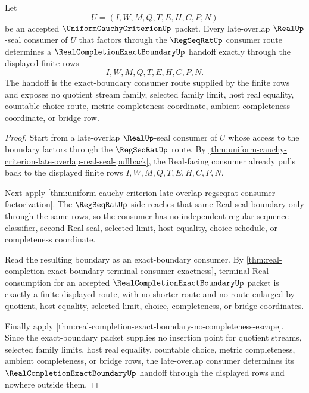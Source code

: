 \begin{theorem}
\label{thm:uniform-cauchy-criterion-late-overlap-exact-boundary-handoff}
Let
$$
U=(I,W,M,Q,T,E,H,C,P,N)
$$
be an accepted $\UniformCauchyCriterionUp$ packet. Every late-overlap $\RealUp$-seal consumer of $U$ that factors through the $\RegSeqRatUp$ consumer route determines a $\RealCompletionExactBoundaryUp$ handoff exactly through the displayed finite rows
$$
I,W,M,Q,T,E,H,C,P,N.
$$
The handoff is the exact-boundary consumer route supplied by the finite rows and exposes no quotient stream family, selected family limit, host real equality, countable-choice route, metric-completeness coordinate, ambient-completeness coordinate, or bridge row.
\end{theorem}
\begin{proof}
Start from a late-overlap $\RealUp$-seal consumer of $U$ whose access to the boundary factors through the $\RegSeqRatUp$ route. By \autoref{thm:uniform-cauchy-criterion-late-overlap-real-seal-pullback}, the Real-facing consumer already pulls back to the displayed finite rows $I,W,M,Q,T,E,H,C,P,N$.

Next apply \autoref{thm:uniform-cauchy-criterion-late-overlap-regseqrat-consumer-factorization}. The $\RegSeqRatUp$ side reaches that same Real-seal boundary only through the same rows, so the consumer has no independent regular-sequence classifier, second Real seal, selected limit, host equality, choice schedule, or completeness coordinate.

Read the resulting boundary as an exact-boundary consumer. By \autoref{thm:real-completion-exact-boundary-terminal-consumer-exactness}, terminal Real consumption for an accepted $\RealCompletionExactBoundaryUp$ packet is exactly a finite displayed route, with no shorter route and no route enlarged by quotient, host-equality, selected-limit, choice, completeness, or bridge coordinates.

Finally apply \autoref{thm:real-completion-exact-boundary-no-completeness-escape}. Since the exact-boundary packet supplies no insertion point for quotient streams, selected family limits, host real equality, countable choice, metric completeness, ambient completeness, or bridge rows, the late-overlap consumer determines its $\RealCompletionExactBoundaryUp$ handoff through the displayed rows and nowhere outside them.
\end{proof}
